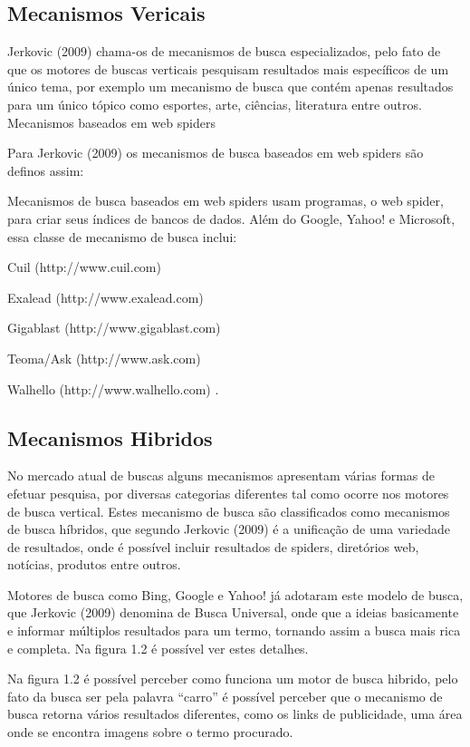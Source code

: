\documentclass[
	12pt,				%
	openright,			%
	twoside,			%
	a4paper,			%
	english,			%
	french,				%
	spanish,			%
	brazil				%
	]{abntex2}
\begin{document}
\subsection{Mecanismos Vericais}

Jerkovic (2009) chama-os de mecanismos de busca especializados, pelo fato de que os motores de buscas verticais pesquisam resultados mais específicos de um único tema, por exemplo um mecanismo de busca que contém apenas resultados para um único tópico como esportes, arte, ciências, literatura entre outros.
Mecanismos baseados em web spiders

Para Jerkovic (2009) os mecanismos de busca baseados em web spiders são definos assim:

\begin{citacao}
Mecanismos de busca baseados em web spiders usam programas, o web spider, para criar seus índices de bancos de dados. Além do Google, Yahoo! e Microsoft, essa classe de mecanismo de busca inclui:

\item Cuil (http://www.cuil.com)
\item Exalead (http://www.exalead.com)
\item Gigablast (http://www.gigablast.com)
\item Teoma/Ask (http://www.ask.com)
\item Walhello (http://www.walhello.com)
\cite[5.3]{NBR10520:2002}.
\end{citacao}

\subsection{Mecanismos Hibridos}

No mercado atual de buscas alguns mecanismos apresentam várias formas de efetuar pesquisa, por diversas categorias diferentes tal como ocorre nos motores de busca vertical. Estes mecanismo de busca são classificados como mecanismos de busca híbridos, que segundo Jerkovic (2009) é a unificação de uma variedade de resultados, onde é possível incluir resultados de spiders, diretórios web, notícias, produtos entre outros.

Motores de busca como Bing, Google e Yahoo! já adotaram este modelo de busca, que Jerkovic (2009) denomina de Busca Universal, onde que a ideias basicamente e informar múltiplos resultados para um termo, tornando assim a busca mais rica e completa. Na figura 1.2 é possível ver estes detalhes.

Na figura 1.2 é possível perceber como funciona um motor de busca hibrido, pelo fato da busca ser pela palavra “carro” é possível perceber que o mecanismo de busca retorna vários resultados diferentes, como os links de publicidade, uma área onde se encontra imagens sobre o termo procurado.
\end{document}

